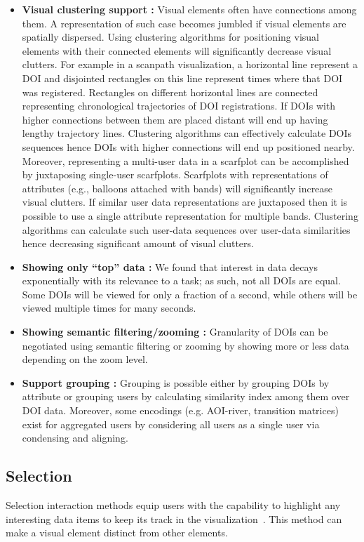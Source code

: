 \begin{itemize}
	\item \textbf{Visual clustering support :} Visual elements often have connections among them. A representation of such case becomes jumbled if visual elements are spatially dispersed. Using clustering algorithms for positioning visual elements with their connected elements will significantly decrease visual clutters. For example in a scanpath visualization, a horizontal line represent a DOI and disjointed rectangles on this line represent times where that DOI was registered. Rectangles on different horizontal lines are connected representing chronological trajectories of DOI registrations. If DOIs with higher connections between them are placed distant will end up having lengthy trajectory lines. Clustering algorithms can effectively calculate DOIs sequences hence DOIs with higher connections will end up positioned nearby. Moreover, representing a multi-user data in a scarfplot can be accomplished by juxtaposing single-user scarfplots. Scarfplots with representations of attributes (e.g., balloons attached with bands) will significantly increase visual clutters. If similar user data representations are juxtaposed then it is possible to use a single attribute representation for multiple bands. Clustering algorithms can calculate such user-data sequences over user-data similarities hence decreasing significant amount of visual clutters. 
	\item \textbf{Showing only ``top'' data :} We found that interest in data decays exponentially with its relevance to a task; as such, not all DOIs are equal. Some DOIs will be viewed for only a fraction of a second, while others will be viewed multiple times for many seconds. 
	\item \textbf{Showing semantic filtering/zooming :} Granularity of DOIs can be negotiated using semantic filtering or zooming by showing more or less data depending on the zoom level.
	\item \textbf{Support grouping :} Grouping is possible either by grouping DOIs by attribute or grouping users by calculating similarity index among them over DOI data. Moreover, some encodings (e.g. AOI-river, transition matrices) exist for aggregated users by considering all users as a single user via condensing and aligning. 
\end{itemize}

\subsection{Selection}
Selection interaction methods equip users with the capability to highlight any interesting data items to keep its track in the visualization~\cite{yi2007toward}. This method can make a visual element distinct from other elements. 

